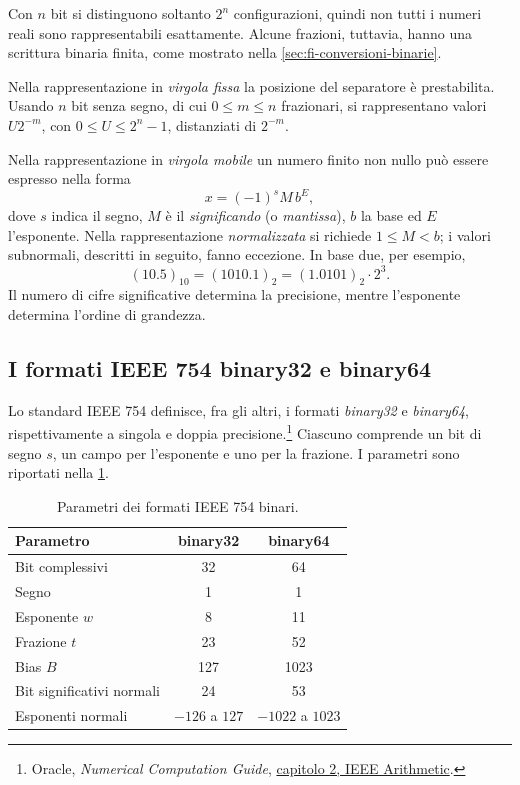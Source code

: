 Con \(n\) bit si distinguono soltanto \(2^n\) configurazioni, quindi
non tutti i numeri reali sono rappresentabili esattamente. Alcune
frazioni, tuttavia, hanno una scrittura binaria finita, come mostrato
nella \cref{sec:fi-conversioni-binarie}.

Nella rappresentazione in \emph{virgola fissa} la posizione del
separatore è prestabilita. Usando \(n\) bit senza segno, di cui
\(0\le m\le n\) frazionari, si rappresentano valori \(U2^{-m}\), con
\(0\le U\le2^n-1\), distanziati di \(2^{-m}\).

Nella rappresentazione in \emph{virgola mobile} un numero finito non
nullo può essere espresso nella forma
\[
  x=(-1)^sM\,b^E,
\]
dove \(s\) indica il segno, \(M\) è il \emph{significando} (o
\emph{mantissa}), \(b\) la base ed \(E\) l'esponente. Nella
rappresentazione \emph{normalizzata} si richiede \(1\le M<b\);
i valori subnormali, descritti in seguito, fanno eccezione.
In base due, per esempio,
\[
  (10.5)_{10}=(1010.1)_2=(1.0101)_2\cdot2^3.
\]
Il numero di cifre significative determina la precisione, mentre
l'esponente determina l'ordine di grandezza.

\subsection{I formati IEEE 754 binary32 e binary64}
\label{sec:fi-ieee754}

Lo standard IEEE 754 definisce, fra gli altri, i formati \emph{binary32}
e \emph{binary64}, rispettivamente a singola e doppia precisione.\footnote{
Oracle, \emph{Numerical Computation Guide},
\href{https://docs.oracle.com/cd/E19957-01/806-3568/ncg_math.html}{capitolo 2, IEEE Arithmetic}.}
Ciascuno comprende un bit di segno \(s\), un campo per l'esponente e
uno per la frazione. I parametri sono riportati nella
\cref{tab:fi-formati-ieee}.

\begin{table}[htbp]
  \centering
  \begin{tabular}{lcc}
    \toprule
    Parametro & binary32 & binary64 \\
    \midrule
    Bit complessivi & 32 & 64 \\
    Segno & 1 & 1 \\
    Esponente \(w\) & 8 & 11 \\
    Frazione \(t\) & 23 & 52 \\
    Bias \(B\) & 127 & 1023 \\
    Bit significativi normali & 24 & 53 \\
    Esponenti normali & \(-126\) a \(127\) & \(-1022\) a \(1023\) \\
    \bottomrule
  \end{tabular}
  \caption{Parametri dei formati IEEE 754 binari.}
  \label{tab:fi-formati-ieee}
\end{table}

